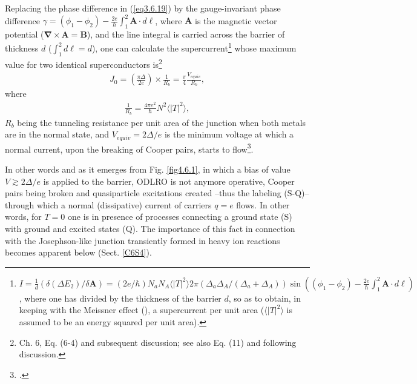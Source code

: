 Replacing the phase difference in (\ref{eq3.6.19}) by the gauge-invariant phase difference $\gamma=(\phi_1-\phi_2)-\frac{2e}{\hbar}\int_1^2\mathbf A\cdot d\pmb \ell$, where $\mathbf A$ is the magnetic vector potential ($\pmb\nabla\times\mathbf A=\mathbf B$), and the line integral is carried across the barrier of thickness $d$ ($\int_1^2d\ell=d$), one can calculate the supercurrent\footnote{$I=\frac{1}{d}\left(\delta(\Delta E_2)/\delta\mathbf A\right)=\left(2e/\hbar\right)N_aN_A\langle|T|^2\rangle2\pi(\Delta_a\Delta_A/(\Delta_a+\Delta_A))\sin\left((\phi_1-\phi_2)-\frac{2e}{\hbar}\int_1^2\mathbf A\cdot d\pmb \ell\right)$, where one has divided by the thickness of the barrier $d$, so as to obtain, in keeping with the Meissner effect (\cite{Meissner:33}), a supercurrent per unit area ($\langle|T|^2\rangle$ is assumed to be an energy squared per unit area).} whose maximum value for two identical superconductors is\footnote{\cite{Tinkham:96} Ch. 6, Eq. (6-4) and subsequent discussion; see also \cite{Anderson:64} Eq. (11) and following discussion.}
\begin{align}\label{eq4.7.20}
J_0=\left(\frac{\pi\Delta}{2e}\right)\times\frac{1}{R_b}=\frac{\pi}{4}\frac{V_{equiv}}{R_b},
\end{align}
where
\begin{align}\label{eq4.7.21}
\frac{1}{R_b}=\frac{4\pi e^2}{\hbar}N^2\langle|T|^2\rangle,
\end{align}
  $R_b$ being the tunneling resistance per unit area of the junction when both metals are in the normal state, and $V_{equiv}=2\Delta/e$ is the minimum voltage at which a normal current, upon the breaking of Cooper pairs, starts to flow\footnote{\cite{Giaver:73}.}. 
  
  In other words and as it emerges from Fig. \ref{fig4.6.1}, in which a bias of value $V\gtrsim2\Delta/e$ is applied to the barrier, ODLRO is not anymore operative, Cooper pairs being broken and quasiparticle excitations created --thus the labeling (S-Q)-- through which a normal (dissipative) current of carriers $q=e$ flows. In other words, for $T=0$ one is in presence of processes connecting a ground state (S) with ground and excited states (Q). The importance of this fact in connection with the Josephson-like junction transiently formed in heavy ion reactions becomes apparent below (Sect. \ref{C6S4}).
  
